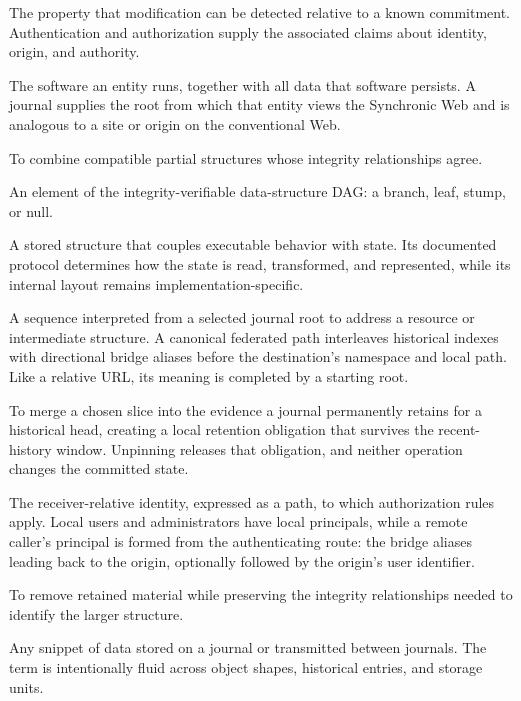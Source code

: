 \begin{description}[style=nextline]
    The property that modification can be detected relative to a known commitment. Authentication and authorization supply the associated claims about identity, origin, and authority.

    The software an entity runs, together with all data that software persists. A journal supplies the root from which that entity views the Synchronic Web and is analogous to a site or origin on the conventional Web.

    To combine compatible partial structures whose integrity relationships agree.

    An element of the integrity-verifiable data-structure DAG: a branch, leaf, stump, or null.

    A stored structure that couples executable behavior with state. Its documented protocol determines how the state is read, transformed, and represented, while its internal layout remains implementation-specific.

    A sequence interpreted from a selected journal root to address a resource or intermediate structure. A canonical federated path interleaves historical indexes with directional bridge aliases before the destination's namespace and local path. Like a relative URL, its meaning is completed by a starting root.

    To merge a chosen slice into the evidence a journal permanently retains for a historical head, creating a local retention obligation that survives the recent-history window. Unpinning releases that obligation, and neither operation changes the committed state.

    The receiver-relative identity, expressed as a path, to which authorization rules apply. Local users and administrators have local principals, while a remote caller's principal is formed from the authenticating route: the bridge aliases leading back to the origin, optionally followed by the origin's user identifier.

    To remove retained material while preserving the integrity relationships needed to identify the larger structure.

    Any snippet of data stored on a journal or transmitted between journals. The term is intentionally fluid across object shapes, historical entries, and storage units.


\end{description}
